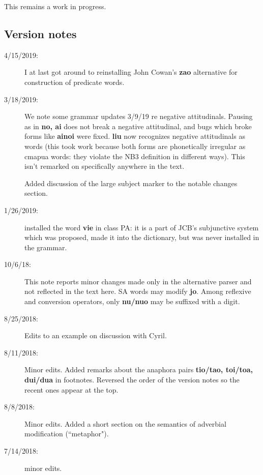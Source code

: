 \documentclass[12pt]{book}
\begin{document}
This remains a work in progress.

\subsection{Version notes}

\begin{description}

\item[4/15/2019:]  I at last got around to reinstalling John Cowan's {\bf zao} alternative for construction of predicate words.

\item[3/18/2019:]  We note some grammar updates 3/9/19 re negative attitudinals.  Pausing as in {\bf no, ai} does not break a negative attitudinal, and bugs which broke forms
like {\bf ainoi} were fixed.  {\bf liu} now recognizes negative attitudinals as words (this took work because both forms are phonetically irregular as cmapua words:  they violate the NB3 definition in different ways).  This isn't remarked on specifically anywhere in the text.

Added discussion of the large subject marker to the notable changes section.

\item[1/26/2019:]  installed the word {\bf vie} in class PA:  it is a part of JCB's subjunctive system which was proposed, made it into the dictionary, but was never installed in the grammar.

\item[10/6/18:]  This note reports minor changes made only in the alternative parser and not reflected in the text here.  SA words may modify {\bf jo}.  Among reflexive and conversion operators, only {\bf nu/nuo} may be suffixed with a digit.

\item[8/25/2018:]  Edits to an example on discussion with Cyril.

\item[8/11/2018:]  Minor edits.  Added remarks about the anaphora pairs {\bf tio/tao, toi/toa, dui/dua} in footnotes.  Reversed the order of the version notes so the recent ones appear at the top.

\item[8/8/2018:]  Minor edits.  Added a short section on the semantics of adverbial modification (``metaphor").

\item[7/14/2018:]  minor edits.




\end{description}
\end{document}
